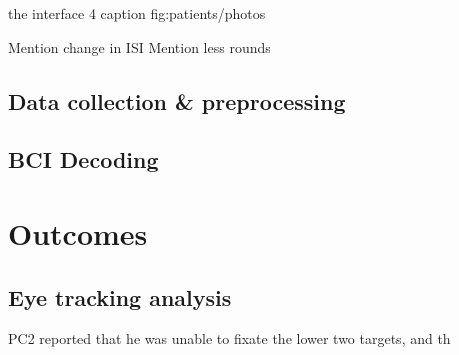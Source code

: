 {  
}{%
  the interface
}{%
  4
}{%
  caption
}{fig:patients/photos}

Mention change in ISI
Mention less rounds

\subsection{Data collection \& preprocessing}

\subsection{BCI Decoding}

\section{Outcomes}

\subsection{Eye tracking analysis}

PC2 reported that he was unable to fixate the lower two targets, and th

